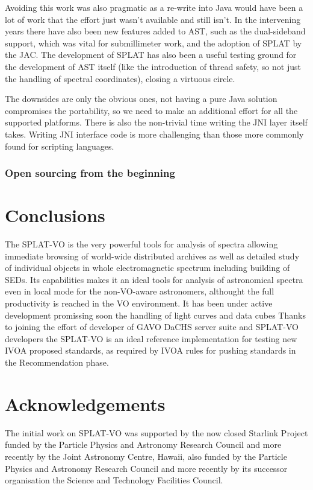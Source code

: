 \documentclass[final,authoryear,5p,times,twocolumn]{elsarticle}
\begin{document}
Avoiding this work was also pragmatic as a re-write into Java would
have been a lot of work that the effort just wasn't available and
still isn't. In the intervening years there have also been new
features added to AST, such as the dual-sideband support, which was
vital for submillimeter work, and the adoption of SPLAT by the
JAC. The development of SPLAT has also been a useful testing ground
for the development of AST itself (like the introduction of thread
safety, so not just the handling of spectral coordinates), closing a
virtuous circle.

The downsides are only the obvious ones, not having a pure Java
solution compromises the portability, so we need to make an additional
effort for all the supported platforms. There is also the non-trivial
time writing the JNI layer itself takes. Writing JNI interface code is
more challenging than those more commonly found for scripting
languages.

\subsubsection{Open sourcing from the beginning}

\section{Conclusions}

The SPLAT-VO is the very powerful tools for analysis of spectra
allowing immediate browsing of world-wide distributed archives as well
as detailed study of individual objects in whole electromagnetic
spectrum including building of SEDs. Its capabilities makes it an
ideal tools for analysis of astronomical spectra even in local mode
for the non-VO-aware astronomers, althought the full productivity is
reached in the VO environment.  It has been under active development
promissing soon the handling of light curves and data cubes Thanks to
joining the effort of developer of GAVO DaCHS server suite and
SPLAT-VO developers the SPLAT-VO is an ideal reference implementation
for testing new IVOA proposed standards, as required by IVOA rules for
pushing standards in the Recommendation phase.

\section*{Acknowledgements}

The initial work on SPLAT-VO was supported
by the now closed Starlink Project funded by the Particle Physics and
Astronomy Research Council and more recently by the Joint Astronomy
Centre, Hawaii, also funded by the Particle Physics and Astronomy
Research Council and more recently by its successor organisation the
Science and Technology Facilities Council.
\end{document}

